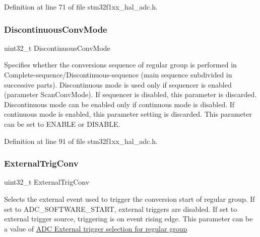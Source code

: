 Definition at line 71 of file stm32f1xx\+\_\+hal\+\_\+adc.\+h.

\mbox{\label{struct_a_d_c___init_type_def_a9029916649c9ed5db0a3d86c7a0841bb}} 
\subsubsection{\texorpdfstring{Discontinuous\+Conv\+Mode}{DiscontinuousConvMode}}
{\footnotesize\ttfamily uint32\+\_\+t Discontinuous\+Conv\+Mode}

Specifies whether the conversions sequence of regular group is performed in Complete-\/sequence/\+Discontinuous-\/sequence (main sequence subdivided in successive parts). Discontinuous mode is used only if sequencer is enabled (parameter \textquotesingle{}Scan\+Conv\+Mode\textquotesingle{}). If sequencer is disabled, this parameter is discarded. Discontinuous mode can be enabled only if continuous mode is disabled. If continuous mode is enabled, this parameter setting is discarded. This parameter can be set to E\+N\+A\+B\+LE or D\+I\+S\+A\+B\+LE. 

Definition at line 91 of file stm32f1xx\+\_\+hal\+\_\+adc.\+h.

\mbox{\label{struct_a_d_c___init_type_def_a3f4a71424165638d6621d75a351cb5e0}} 
\subsubsection{\texorpdfstring{External\+Trig\+Conv}{ExternalTrigConv}}
{\footnotesize\ttfamily uint32\+\_\+t External\+Trig\+Conv}

Selects the external event used to trigger the conversion start of regular group. If set to A\+D\+C\+\_\+\+S\+O\+F\+T\+W\+A\+R\+E\+\_\+\+S\+T\+A\+RT, external triggers are disabled. If set to external trigger source, triggering is on event rising edge. This parameter can be a value of \hyperlink{group___a_d_c___external__trigger__source___regular}{A\+DC External trigger selection for regular group} 

